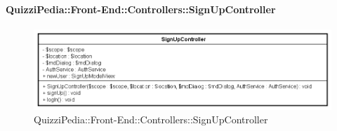 \paragraph{QuizziPedia::Front-End::Controllers::SignUpController}
\begin{figure} [ht]
	\centering
	\includegraphics[scale=0.80]{UML/Classi/Front-End/QuizziPedia_Front-end_Controller_SignUpController.png}
	\caption{QuizziPedia::Front-End::Controllers::SignUpController}
\end{figure} \FloatBarrier
